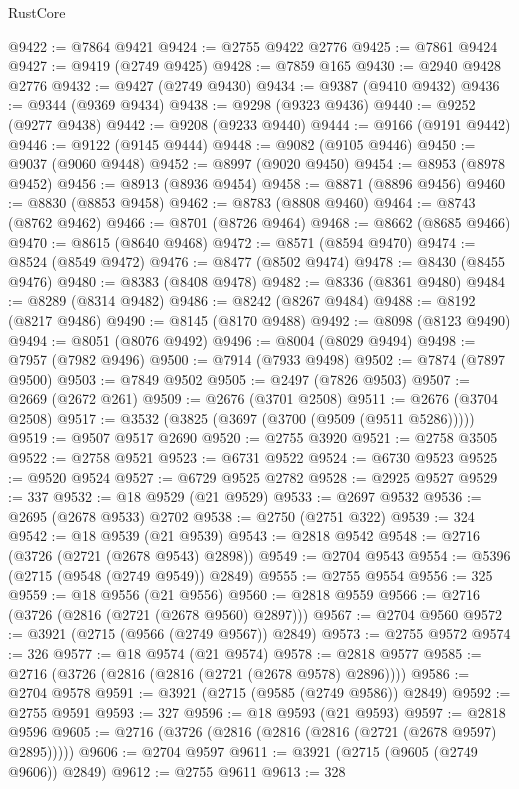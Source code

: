 \begin{lexlean}{RustCore}
\begin{coremodule}
@9422 := @7864 @9421
@9424 := @2755 @9422 @2776
@9425 := @7861 @9424
@9427 := @9419 (@2749 @9425)
@9428 := @7859 @165
@9430 := @2940 @9428 @2776
@9432 := @9427 (@2749 @9430)
@9434 := @9387 (@9410 @9432)
@9436 := @9344 (@9369 @9434)
@9438 := @9298 (@9323 @9436)
@9440 := @9252 (@9277 @9438)
@9442 := @9208 (@9233 @9440)
@9444 := @9166 (@9191 @9442)
@9446 := @9122 (@9145 @9444)
@9448 := @9082 (@9105 @9446)
@9450 := @9037 (@9060 @9448)
@9452 := @8997 (@9020 @9450)
@9454 := @8953 (@8978 @9452)
@9456 := @8913 (@8936 @9454)
@9458 := @8871 (@8896 @9456)
@9460 := @8830 (@8853 @9458)
@9462 := @8783 (@8808 @9460)
@9464 := @8743 (@8762 @9462)
@9466 := @8701 (@8726 @9464)
@9468 := @8662 (@8685 @9466)
@9470 := @8615 (@8640 @9468)
@9472 := @8571 (@8594 @9470)
@9474 := @8524 (@8549 @9472)
@9476 := @8477 (@8502 @9474)
@9478 := @8430 (@8455 @9476)
@9480 := @8383 (@8408 @9478)
@9482 := @8336 (@8361 @9480)
@9484 := @8289 (@8314 @9482)
@9486 := @8242 (@8267 @9484)
@9488 := @8192 (@8217 @9486)
@9490 := @8145 (@8170 @9488)
@9492 := @8098 (@8123 @9490)
@9494 := @8051 (@8076 @9492)
@9496 := @8004 (@8029 @9494)
@9498 := @7957 (@7982 @9496)
@9500 := @7914 (@7933 @9498)
@9502 := @7874 (@7897 @9500)
@9503 := @7849 @9502
@9505 := @2497 (@7826 @9503)
@9507 := @2669 (@2672 @261)
@9509 := @2676 (@3701 @2508)
@9511 := @2676 (@3704 @2508)
@9517 := @3532 (@3825 (@3697 (@3700 (@9509 (@9511 @5286)))))
@9519 := @9507 @9517 @2690
@9520 := @2755 @3920
@9521 := @2758 @3505
@9522 := @2758 @9521
@9523 := @6731 @9522
@9524 := @6730 @9523
@9525 := @9520 @9524
@9527 := @6729 @9525 @2782
@9528 := @2925 @9527
@9529 := 337
@9532 := @18 @9529 (@21 @9529)
@9533 := @2697 @9532
@9536 := @2695 (@2678 @9533) @2702
@9538 := @2750 (@2751 @322)
@9539 := 324
@9542 := @18 @9539 (@21 @9539)
@9543 := @2818 @9542
@9548 := @2716 (@3726 (@2721 (@2678 @9543) @2898))
@9549 := @2704 @9543
@9554 := @5396 (@2715 (@9548 (@2749 @9549)) @2849)
@9555 := @2755 @9554
@9556 := 325
@9559 := @18 @9556 (@21 @9556)
@9560 := @2818 @9559
@9566 := @2716 (@3726 (@2816 (@2721 (@2678 @9560) @2897)))
@9567 := @2704 @9560
@9572 := @3921 (@2715 (@9566 (@2749 @9567)) @2849)
@9573 := @2755 @9572
@9574 := 326
@9577 := @18 @9574 (@21 @9574)
@9578 := @2818 @9577
@9585 := @2716 (@3726 (@2816 (@2816 (@2721 (@2678 @9578) @2896))))
@9586 := @2704 @9578
@9591 := @3921 (@2715 (@9585 (@2749 @9586)) @2849)
@9592 := @2755 @9591
@9593 := 327
@9596 := @18 @9593 (@21 @9593)
@9597 := @2818 @9596
@9605 := @2716 (@3726 (@2816 (@2816 (@2816 (@2721 (@2678 @9597) @2895)))))
@9606 := @2704 @9597
@9611 := @3921 (@2715 (@9605 (@2749 @9606)) @2849)
@9612 := @2755 @9611
@9613 := 328

\end{coremodule}
\end{lexlean}
